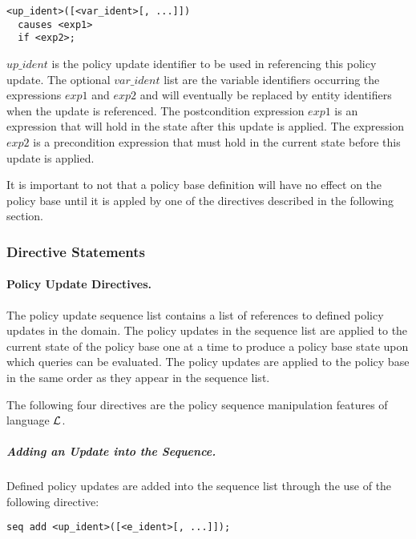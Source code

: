 \documentclass[10pt, twocolumn]{article}
\begin{document}
          \begin{verbatim}
<up_ident>([<var_ident>[, ...]])
  causes <exp1>
  if <exp2>;
          \end{verbatim}

          $up\_ident$ is the policy update identifier to be used in referencing
          this policy update. The optional $var\_ident$ list are the variable
          identifiers occurring the expressions $exp1$ and $exp2$ and will
          eventually be replaced by entity identifiers when the update is
          referenced. The postcondition expression $exp1$ is an expression that
          will hold in the state after this update is applied. The expression
          $exp2$ is a precondition expression that must hold in the current
          state before this update is applied.

          It is important to not that a policy base definition will have no
          effect on the policy base until it is appled by one of the directives
          described in the following section.

        \subsubsection{Directive Statements}

        \paragraph{Policy Update Directives.}

        The policy update sequence list contains a list of references to
        defined policy updates in the domain. The policy updates in the
        sequence list are applied to the current state of the policy base one
        at a time to produce a policy base state upon which queries can be
        evaluated. The policy updates are applied to the policy base in the
        same order as they appear in the sequence list.

        The following four directives are the policy sequence manipulation
        features of language $\cal{L}$.

        \subparagraph{Adding an Update into the Sequence.}
          Defined policy updates are added into the sequence list through the
          use of the following directive:

          \begin{verbatim}seq add <up_ident>([<e_ident>[, ...]]);\end{verbatim}
\end{document}
